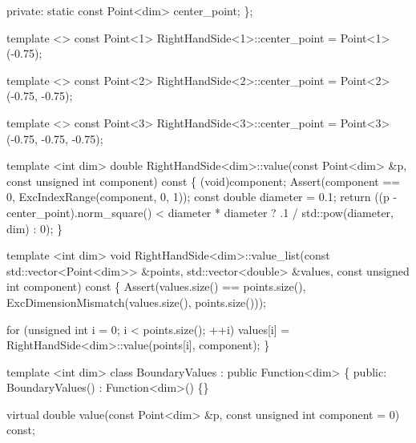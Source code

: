 \begin{DoxyCodeInclude}
\textcolor{keyword}{private}:
    \textcolor{keyword}{static} \textcolor{keyword}{const} Point<dim> center\_point;
\};


\textcolor{keyword}{template} <>
\textcolor{keyword}{const} Point<1> RightHandSide<1>::center\_point = Point<1>(-0.75);

\textcolor{keyword}{template} <>
\textcolor{keyword}{const} Point<2> RightHandSide<2>::center\_point = Point<2>(-0.75, -0.75);

\textcolor{keyword}{template} <>
\textcolor{keyword}{const} Point<3> RightHandSide<3>::center\_point = Point<3>(-0.75, -0.75, -0.75);


\textcolor{keyword}{template} <\textcolor{keywordtype}{int} dim>
\textcolor{keywordtype}{double} RightHandSide<dim>::value(\textcolor{keyword}{const} Point<dim> &p,
                                 \textcolor{keyword}{const} \textcolor{keywordtype}{unsigned} \textcolor{keywordtype}{int} component)\textcolor{keyword}{ const}
\textcolor{keyword}{}\{
    (void)component;
    Assert(component == 0, ExcIndexRange(component, 0, 1));
    \textcolor{keyword}{const} \textcolor{keywordtype}{double} diameter = 0.1;
    \textcolor{keywordflow}{return} ((p - center\_point).norm\_square() < diameter * diameter
                ? .1 / std::pow(diameter, dim)
                : 0);
\}


\textcolor{keyword}{template} <\textcolor{keywordtype}{int} dim>
\textcolor{keywordtype}{void} RightHandSide<dim>::value\_list(\textcolor{keyword}{const} std::vector<Point<dim>> &points,
                                    std::vector<double> &values,
                                    \textcolor{keyword}{const} \textcolor{keywordtype}{unsigned} \textcolor{keywordtype}{int} component)\textcolor{keyword}{ const}
\textcolor{keyword}{}\{
    Assert(values.size() == points.size(),
           ExcDimensionMismatch(values.size(), points.size()));

    \textcolor{keywordflow}{for} (\textcolor{keywordtype}{unsigned} \textcolor{keywordtype}{int} i = 0; i < points.size(); ++i)
        values[i] = RightHandSide<dim>::value(points[i], component);
\}


\textcolor{keyword}{template} <\textcolor{keywordtype}{int} dim>
\textcolor{keyword}{class }BoundaryValues : \textcolor{keyword}{public} Function<dim> \{
\textcolor{keyword}{public}:
    BoundaryValues() : Function<dim>() \{\}

    \textcolor{keyword}{virtual} \textcolor{keywordtype}{double} value(\textcolor{keyword}{const} Point<dim> &p,
                         \textcolor{keyword}{const} \textcolor{keywordtype}{unsigned} \textcolor{keywordtype}{int} component = 0) \textcolor{keyword}{const};


\end{DoxyCodeInclude}
